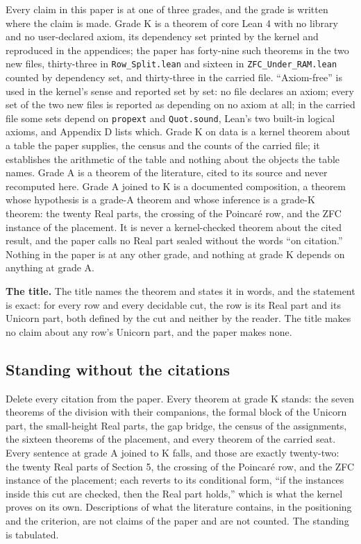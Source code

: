 \documentclass[10pt]{article}
\begin{document}
Every claim in this paper is at one of three grades, and the grade is
written where the claim is made. Grade K is a theorem of core Lean 4
with no library and no user-declared axiom, its dependency set printed
by the kernel and reproduced in the appendices; the paper has forty-nine
such theorems in the two new files, thirty-three in
\texttt{Row\_Split.lean} and sixteen in \texttt{ZFC\_Under\_RAM.lean}
counted by dependency set, and thirty-three in the carried file.
``Axiom-free'' is used in the kernel's sense and reported set by set: no
file declares an axiom; every set of the two new files is reported as
depending on no axiom at all; in the carried file some sets depend on
\texttt{propext} and \texttt{Quot.sound}, Lean's two built-in logical
axioms, and Appendix D lists which. Grade K on data is a kernel theorem
about a table the paper supplies, the census and the counts of the
carried file; it establishes the arithmetic of the table and nothing
about the objects the table names. Grade A is a theorem of the
literature, cited to its source and never recomputed here. Grade A
joined to K is a documented composition, a theorem whose hypothesis is a
grade-A theorem and whose inference is a grade-K theorem: the twenty
Real parts, the crossing of the Poincaré row, and the ZFC instance of
the placement. It is never a kernel-checked theorem about the cited
result, and the paper calls no Real part sealed without the words ``on
citation.'' Nothing in the paper is at any other grade, and nothing at
grade K depends on anything at grade A.

\textbf{The title.} The title names the theorem and states it in words,
and the statement is exact: for every row and every decidable cut, the
row is its Real part and its Unicorn part, both defined by the cut and
neither by the reader. The title makes no claim about any row's Unicorn
part, and the paper makes none.

\hypertarget{standing-without-the-citations}{%
\subsection{Standing without the
citations}\label{standing-without-the-citations}}

Delete every citation from the paper. Every theorem at grade K stands:
the seven theorems of the division with their companions, the formal
block of the Unicorn part, the small-height Real parts, the gap bridge,
the census of the assignments, the sixteen theorems of the placement,
and every theorem of the carried seat. Every sentence at grade A joined
to K falls, and those are exactly twenty-two: the twenty Real parts of
Section 5, the crossing of the Poincaré row, and the ZFC instance of the
placement; each reverts to its conditional form, ``if the instances
inside this cut are checked, then the Real part holds,'' which is what
the kernel proves on its own. Descriptions of what the literature
contains, in the positioning and the criterion, are not claims of the
paper and are not counted. The standing is tabulated.
\end{document}
